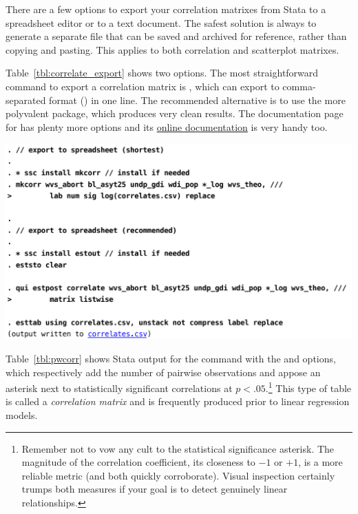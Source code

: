 There are a few options to export your correlation matrixes from Stata to a spreadsheet editor or to a text document. The safest solution is always to generate a separate file that can be saved and archived for reference, rather than copying and pasting. This applies to both correlation and scatterplot matrixes.

Table~\ref{tbl:correlate_export} shows two options. The most straightforward command to export a correlation matrix is , which can export to comma-separated format () in one line. The recommended alternative is to use the more polyvalent  package, which produces very clean results. The documentation page for  has plenty more options and its \href{http://repec.org/bocode/e/estout/estpost.html#estpost112}{online documentation} is very handy too.

\begin{table}[htp]
	\includegraphics[scale=.5]{images/correlate_export.pdf}

	\caption[Exporting a correlation matrix with  and ]{\label{tbl:correlate_export}%
	Exporting a correlation matrix with  and . %
  See  and related online documentation for options. %
	\qog}
\end{table}%

Table~\ref{tbl:pwcorr} shows Stata output for the  command with the  and  options, which respectively add the number of pairwise observations and appose an asterisk next to statistically significant correlations at $p < .05$.\footnote{Remember not to vow any cult to the statistical significance asterisk. The magnitude of the correlation coefficient, \ie its closeness to $-1$ or $+1$, is a more reliable metric (and both quickly corroborate). Visual inspection certainly trumps both measures if your goal is to detect genuinely linear relationships.} This type of table is called a \emph{correlation matrix} and is frequently produced prior to linear regression models.

